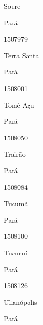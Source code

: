 \documentclass[
  letterpaper,
]{report}
\begin{document}
Soure

\n    

\n    

\n      

Pará

\n      

1507979

\n      

Terra Santa

\n    

\n    

\n      

Pará

\n      

1508001

\n      

Tomé-Açu

\n    

\n    

\n      

Pará

\n      

1508050

\n      

Trairão

\n    

\n    

\n      

Pará

\n      

1508084

\n      

Tucumã

\n    

\n    

\n      

Pará

\n      

1508100

\n      

Tucuruí

\n    

\n    

\n      

Pará

\n      

1508126

\n      

Ulianópolis

\n    

\n    

\n      

Pará

\n      
\end{document}
